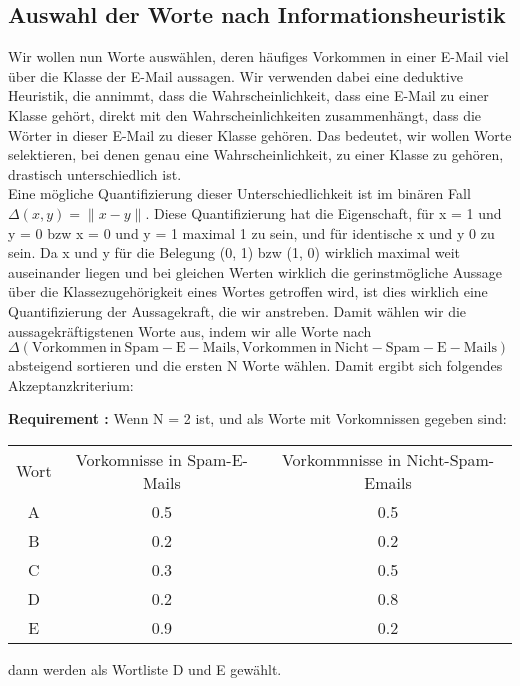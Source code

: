 \documentclass{article}
\newcounter{requirementscount}{}
\newcommand{\requirement}[1] {
        \addtocounter{requirementscount}{1}
        {\bf Requirement \therequirementscount:} #1\\
    }
\begin{document}
\subsection{Auswahl der Worte nach Informationsheuristik}
Wir wollen nun Worte ausw\"ahlen, deren h\"aufiges Vorkommen in einer
 E-Mail viel \"uber die Klasse der E-Mail aussagen.
Wir verwenden dabei eine deduktive Heuristik, die annimmt, dass die
 Wahrscheinlichkeit, dass eine E-Mail zu einer Klasse geh\"ort, direkt
 mit den Wahrscheinlichkeiten zusammenh\"angt, dass die W\"orter in
 dieser E-Mail zu dieser Klasse geh\"oren. 
Das bedeutet, wir wollen Worte selektieren, bei denen genau eine 
 Wahrscheinlichkeit, zu einer Klasse zu geh\"oren, drastisch unterschiedlich
 ist.\\
Eine m\"ogliche Quantifizierung dieser Unterschiedlichkeit ist im bin\"aren
 Fall \(\Delta(x, y) = \|x - y\|\).
Diese Quantifizierung hat die Eigenschaft, f\"ur 
 x = 1 und y = 0 bzw x = 0 und y = 1 maximal 1 zu sein, und f\"ur identische 
 x und y 0 zu sein. 
Da x und y f\"ur die Belegung (0, 1) bzw (1, 0) wirklich maximal weit 
 auseinander liegen und bei gleichen Werten wirklich die gerinstm\"ogliche
 Aussage \"uber die Klassezugeh\"origkeit eines Wortes getroffen wird, 
 ist dies wirklich eine Quantifizierung der Aussagekraft, die wir anstreben. 
Damit w\"ahlen wir die aussagekr\"aftigstenen Worte aus, indem wir alle Worte 
    nach 
\(\Delta(\mathrm{Vorkommen~in~Spam-E-Mails}, 
         \mathrm{Vorkommen~in~Nicht-Spam-E-Mails})\) 
 absteigend sortieren und die ersten N Worte w\"ahlen. 
Damit ergibt sich folgendes Akzeptanzkriterium:\\
\requirement{Wenn N = 2 ist, und als Worte mit Vorkomnissen gegeben sind:
\begin{center}
\begin{tabular}{c c c}
Wort & Vorkomnisse in Spam-E-Mails & Vorkommnisse in Nicht-Spam-Emails \\
A & 0.5 & 0.5 \\
B & 0.2 & 0.2 \\
C & 0.3 & 0.5 \\
D & 0.2 & 0.8 \\
E & 0.9 & 0.2
\end{tabular}
\end{center}
dann werden als Wortliste D und E gew\"ahlt.}
\end{document}
